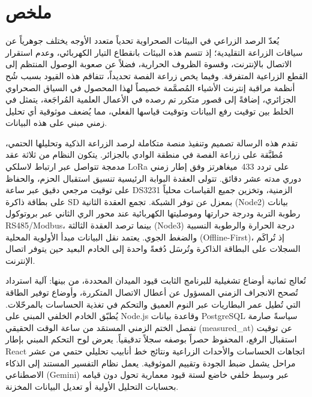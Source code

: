 
\chapter*{ملخص}

\begin{Arabic}

يُعدّ الرصد الزراعي في البيئات الصحراوية تحدياً متعدد الأوجه يختلف جوهرياً عن سياقات
الزراعة التقليدية؛ إذ تتسم هذه البيئات بانقطاع التيار الكهربائي، وعدم استقرار
الاتصال بالإنترنت، وقسوة الظروف الحرارية، فضلاً عن صعوبة الوصول المنتظم إلى
القطع الزراعية المتفرقة. وفيما يخص زراعة الفصة تحديداً، تتفاقم هذه القيود بسبب
شُح أنظمة مراقبة إنترنت الأشياء المُصمَّمة خصيصاً لهذا المحصول في السياق الصحراوي
الجزائري، إضافةً إلى قصور متكرر تم رصده في الأعمال العلمية المُراجَعة، يتمثل في
الخلط بين توقيت رفع البيانات وتوقيت قياسها الفعلي، مما يُضعف موثوقية أي تحليل
زمني مبني على هذه البيانات.

تقدم هذه الرسالة تصميم وتنفيذ منصة متكاملة لرصد الزراعة الذكية وتحليلها الحتمي،
مُطبَّقة على زراعة الفصة في منطقة الوادي بالجزائر. يتكون النظام من ثلاثة عقد
مدمجة تتواصل عبر ارتباط لاسلكي LoRa على تردد 433~ميغاهرتز وفق إطار زمني دوري
مدته عشر دقائق. تتولى العقدة البوابة الرئيسية تنسيق استقبال الحزم، والحفاظ على
توقيت مرجعي دقيق عبر ساعة DS3231 الزمنية، وتخزين جميع القياسات محلياً على بطاقة
ذاكرة SD بمعزل عن توفر الشبكة. تجمع العقدة الثانية (Node2) بيانات رطوبة التربة
ودرجة حرارتها وموصليتها الكهربائية عند محور الري الثاني عبر بروتوكول RS485/Modbus،
بينما ترصد العقدة الثالثة (Node3) درجة الحرارة والرطوبة النسبية والضغط الجوي.
يعتمد نقل البيانات مبدأ الأولوية المحلية (Offline-First)، إذ تُراكَم السجلات
على البطاقة الذاكرة وتُرسَل دُفعةً واحدة إلى الخادم البعيد حين يتوفر اتصال الإنترنت.

تُعالج ثمانية أوضاع تشغيلية للبرنامج الثابت قيود الميدان المحددة، من بينها:
آلية استرداد تُصحح الانجراف الزمني المسؤول عن أعطال الاتصال المتكررة، وأوضاع
توفير الطاقة التي تُطيل عمر البطاريات عبر النوم العميق والتحكم في تغذية
الحساسات بالمرحّلات. يُطبّق الخادم الخلفي المبني على Node.js وقاعدة بيانات
PostgreSQL سياسةً صارمة تفصل الختم الزمني المستمَد من ساعة الوقت الحقيقي
(measured\_at) عن توقيت استقبال الرفع، المحفوظ حصراً بوصفه
سجلاً تدقيقياً. يعرض لوح التحكم المبني بإطار React اتجاهات الحساسات والأحداث
الزراعية ونتائج خط أنابيب تحليلي حتمي من عشر مراحل يشمل ضبط الجودة وتقييم
الموثوقية. يعمل نظام التفسير المستند إلى الذكاء الاصطناعي (Gemini) عبر وسيط
خلفي خاضع لستة قيود معمارية تحول دون قيامه بحسابات التحليل الأولية أو تعديل
البيانات المخزنة.


\end{Arabic}
